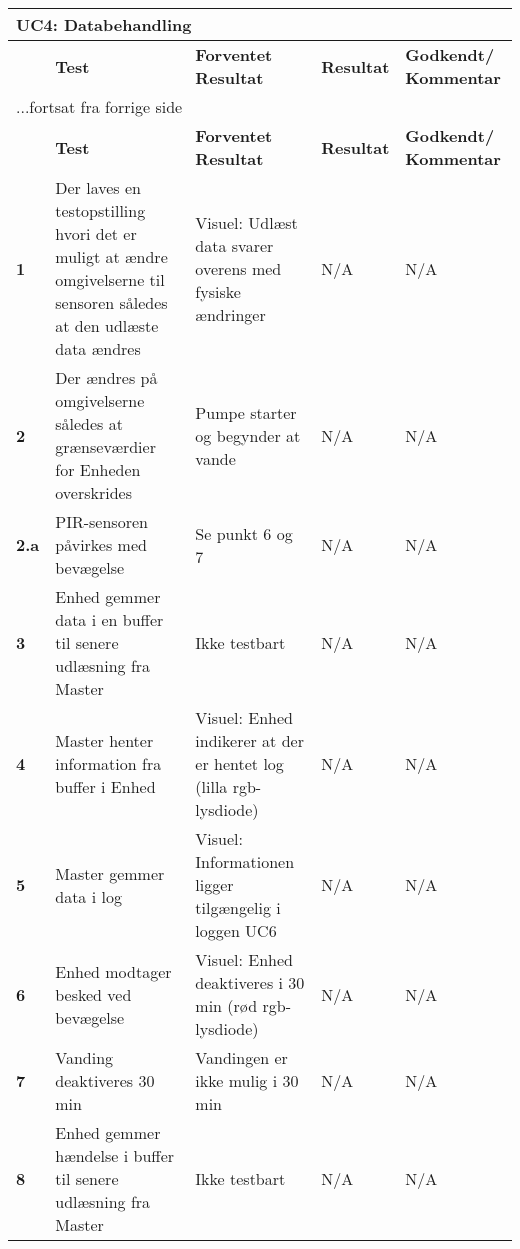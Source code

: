 
\begin{center}
\begin{longtable}{|p{}|p{}|p{}|p{}|p{}|} %
\hline
\multicolumn{5}{|l|}{\textbf{UC4: Databehandling}} \\ \hline
\multicolumn{1}{|c|}{} &
\textbf{Test} &
\textbf{Forventet \newline Resultat} &
\textbf{Resultat} &
\textbf{Godkendt/ \newline Kommentar} \\ \hline 
\endfirsthead

\multicolumn{5}{l}{...fortsat fra forrige side} \\ \hline 
\multicolumn{1}{|c|}{} &
\textbf{Test} &
\textbf{Forventet \newline Resultat} &
\textbf{Resultat} &
\textbf{Godkendt/ \newline Kommentar} \\ \hline 
\endhead

\textbf{1}	&Der laves en testopstilling hvori det er muligt at ændre omgivelserne til sensoren således at den udlæste data ændres
			&Visuel: Udlæst data svarer overens med fysiske ændringer
			&N/A
			&N/A \\ \hline 
			
\textbf{2}	&Der ændres på omgivelserne således at grænseværdier for Enheden overskrides
			&Pumpe starter og begynder at vande
			&N/A
			&N/A \\ \hline 
			
\textbf{2.a}	&PIR-sensoren påvirkes med bevægelse
			&Se punkt 6 og 7
			&N/A
			&N/A \\ \hline 
			
\textbf{3}	&Enhed gemmer data i en buffer til senere udlæsning fra Master
			&Ikke testbart
			&N/A
			&N/A \\ \hline 

\textbf{4}	&Master henter information fra buffer i Enhed
			&Visuel: Enhed indikerer at der er hentet log (lilla rgb-lysdiode)
			&N/A
			&N/A \\ \hline 
			
\textbf{5}	&Master gemmer data i log 
			&Visuel: Informationen ligger tilgængelig i loggen UC6
			&N/A
			&N/A \\ \hline 
			
\textbf{6}	&Enhed modtager besked ved bevægelse
			&Visuel: Enhed deaktiveres i 30 min (rød rgb-lysdiode)
			&N/A
			&N/A \\ \hline 
			
\textbf{7}	&Vanding deaktiveres 30 min
			&Vandingen er ikke mulig i 30 min
			&N/A
			&N/A \\ \hline 
			
\textbf{8}	&Enhed gemmer hændelse i buffer til senere udlæsning fra Master
			&Ikke testbart
			&N/A
			&N/A \\ \hline 					
			
\end{longtable}
	\label{ATUC4} 
\end{center}
